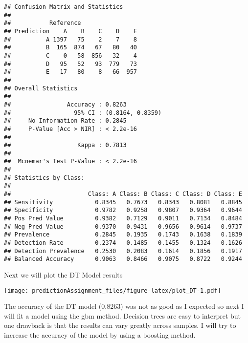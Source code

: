 \documentclass[]{article}
\newenvironment{Shaded}{\begin{snugshade}}{\end{snugshade}}
\newcommand{\DataTypeTok}[1]{\textcolor[rgb]{0.13,0.29,0.53}{#1}}
\newcommand{\DecValTok}[1]{\textcolor[rgb]{0.00,0.00,0.81}{#1}}
\newcommand{\KeywordTok}[1]{\textcolor[rgb]{0.13,0.29,0.53}{\textbf{#1}}}
\newcommand{\NormalTok}[1]{#1}
\newcommand{\OperatorTok}[1]{\textcolor[rgb]{0.81,0.36,0.00}{\textbf{#1}}}
\newcommand{\OtherTok}[1]{\textcolor[rgb]{0.56,0.35,0.01}{#1}}
\newcommand{\StringTok}[1]{\textcolor[rgb]{0.31,0.60,0.02}{#1}}
\begin{document}
\begin{verbatim}
## Confusion Matrix and Statistics
## 
##           Reference
## Prediction    A    B    C    D    E
##          A 1397   75    2    7    8
##          B  165  874   67   80   40
##          C    0   58  856   32    4
##          D   95   52   93  779   73
##          E   17   80    8   66  957
## 
## Overall Statistics
##                                           
##                Accuracy : 0.8263          
##                  95% CI : (0.8164, 0.8359)
##     No Information Rate : 0.2845          
##     P-Value [Acc > NIR] : < 2.2e-16       
##                                           
##                   Kappa : 0.7813          
##                                           
##  Mcnemar's Test P-Value : < 2.2e-16       
## 
## Statistics by Class:
## 
##                      Class: A Class: B Class: C Class: D Class: E
## Sensitivity            0.8345   0.7673   0.8343   0.8081   0.8845
## Specificity            0.9782   0.9258   0.9807   0.9364   0.9644
## Pos Pred Value         0.9382   0.7129   0.9011   0.7134   0.8484
## Neg Pred Value         0.9370   0.9431   0.9656   0.9614   0.9737
## Prevalence             0.2845   0.1935   0.1743   0.1638   0.1839
## Detection Rate         0.2374   0.1485   0.1455   0.1324   0.1626
## Detection Prevalence   0.2530   0.2083   0.1614   0.1856   0.1917
## Balanced Accuracy      0.9063   0.8466   0.9075   0.8722   0.9244
\end{verbatim}

Next we will plot the DT Model results

\begin{Shaded}
\end{Shaded}

\texttt{[image: predictionAssignment\_files/figure-latex/plot\_DT-1.pdf]}

The accuracy of the DT model (0.8263) was not as good as I expected so
next I will fit a model using the gbm method. Decision trees are easy to
interpret but one drawback is that the results can vary greatly across
samples. I will try to increase the accuracy of the model by using a
boosting method.
\end{document}
